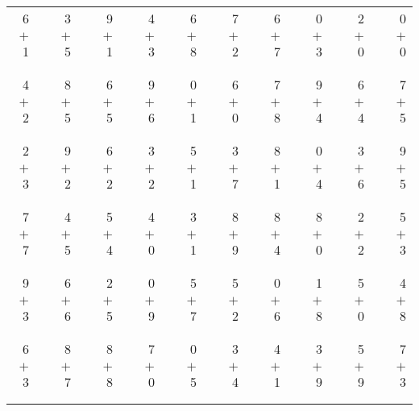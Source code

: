 \documentclass[12pt, letterpaper]{article}
\begin{document}
\begin{tabular}{rrrrrrrrrrrrrrrrrrr}
6 & & 3 & & 9 & & 4 & & 6 & & 7 & & 6 & & 0 & & 2 & & 0\\
$+$ 1 & & $+$ 5 & & $+$ 1 & & $+$ 3 & & $+$ 8 & & $+$ 2 & & $+$ 7 & & $+$ 3 & & $+$ 0 & & $+$ 0\\
\cline{1-1} \cline{3-3} \cline{5-5} \cline{7-7} \cline{9-9} \cline{11-11} \cline{13-13} \cline{15-15} \cline{17-17} \cline{19-19} \\ \\
4 & & 8 & & 6 & & 9 & & 0 & & 6 & & 7 & & 9 & & 6 & & 7\\
$+$ 2 & & $+$ 5 & & $+$ 5 & & $+$ 6 & & $+$ 1 & & $+$ 0 & & $+$ 8 & & $+$ 4 & & $+$ 4 & & $+$ 5\\
\cline{1-1} \cline{3-3} \cline{5-5} \cline{7-7} \cline{9-9} \cline{11-11} \cline{13-13} \cline{15-15} \cline{17-17} \cline{19-19} \\ \\
2 & & 9 & & 6 & & 3 & & 5 & & 3 & & 8 & & 0 & & 3 & & 9\\
$+$ 3 & & $+$ 2 & & $+$ 2 & & $+$ 2 & & $+$ 1 & & $+$ 7 & & $+$ 1 & & $+$ 4 & & $+$ 6 & & $+$ 5\\
\cline{1-1} \cline{3-3} \cline{5-5} \cline{7-7} \cline{9-9} \cline{11-11} \cline{13-13} \cline{15-15} \cline{17-17} \cline{19-19} \\ \\
7 & & 4 & & 5 & & 4 & & 3 & & 8 & & 8 & & 8 & & 2 & & 5\\
$+$ 7 & & $+$ 5 & & $+$ 4 & & $+$ 0 & & $+$ 1 & & $+$ 9 & & $+$ 4 & & $+$ 0 & & $+$ 2 & & $+$ 3\\
\cline{1-1} \cline{3-3} \cline{5-5} \cline{7-7} \cline{9-9} \cline{11-11} \cline{13-13} \cline{15-15} \cline{17-17} \cline{19-19} \\ \\
9 & & 6 & & 2 & & 0 & & 5 & & 5 & & 0 & & 1 & & 5 & & 4\\
$+$ 3 & & $+$ 6 & & $+$ 5 & & $+$ 9 & & $+$ 7 & & $+$ 2 & & $+$ 6 & & $+$ 8 & & $+$ 0 & & $+$ 8\\
\cline{1-1} \cline{3-3} \cline{5-5} \cline{7-7} \cline{9-9} \cline{11-11} \cline{13-13} \cline{15-15} \cline{17-17} \cline{19-19} \\ \\
6 & & 8 & & 8 & & 7 & & 0 & & 3 & & 4 & & 3 & & 5 & & 7\\
$+$ 3 & & $+$ 7 & & $+$ 8 & & $+$ 0 & & $+$ 5 & & $+$ 4 & & $+$ 1 & & $+$ 9 & & $+$ 9 & & $+$ 3\\
\cline{1-1} \cline{3-3} \cline{5-5} \cline{7-7} \cline{9-9} \cline{11-11} \cline{13-13} \cline{15-15} \cline{17-17} \cline{19-19} \\ \\

\end{tabular}
\end{document}
